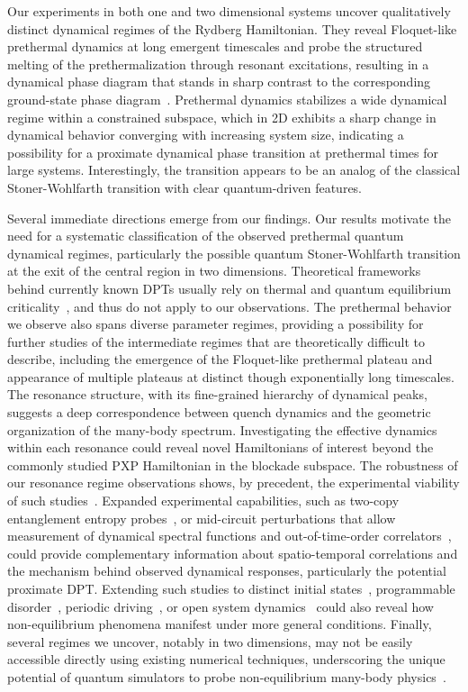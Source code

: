 \documentclass[english,floatfix,twocolumn,showpacs, aps, prx, reprint, superscriptaddress, longbibliography]{revtex4-2}
\begin{document}
Our experiments in both one and two dimensional systems uncover qualitatively distinct dynamical regimes of the Rydberg Hamiltonian. They reveal Floquet-like prethermal dynamics at long emergent timescales and probe the structured melting of the prethermalization through resonant excitations, resulting in a dynamical phase diagram that stands in sharp contrast to the corresponding ground-state phase diagram~\cite{Ebadi:2021}. Prethermal dynamics stabilizes a wide dynamical regime within a constrained subspace, which in 2D exhibits a sharp change in dynamical behavior converging with increasing system size, indicating a  possibility for a proximate dynamical phase transition at prethermal times for large systems. Interestingly, the transition appears to be an analog of the classical Stoner-Wohlfarth transition with clear quantum-driven features. 

Several immediate directions emerge from our findings. Our results motivate the need for a systematic classification of the observed prethermal quantum dynamical regimes, particularly the possible quantum Stoner-Wohlfarth transition at the exit of the central region in two dimensions. Theoretical frameworks behind currently known DPTs usually rely on thermal and quantum equilibrium criticality~\cite{Heyl:2013, Halimeh:2017, Titum:2019, Zunkovic:2018}, and thus do not apply to our observations. The prethermal behavior we observe also spans diverse parameter regimes, providing a possibility for further studies of the intermediate regimes that are theoretically difficult to describe, including the emergence of the Floquet-like prethermal plateau and appearance of multiple plateaus at distinct though exponentially long timescales. The resonance structure, with its fine-grained hierarchy of dynamical peaks, suggests a deep correspondence between quench dynamics and the geometric organization of the many-body spectrum. Investigating the effective dynamics within each resonance could reveal novel Hamiltonians of interest beyond the commonly studied PXP Hamiltonian in the blockade subspace. The robustness of our resonance regime observations shows, by precedent, the experimental viability of such studies~\cite{Liu:2022}. Expanded experimental capabilities, such as two-copy entanglement entropy probes~\cite{Bluvstein:2022}, or mid-circuit perturbations that allow measurement of dynamical spectral functions and out-of-time-order correlators~\cite{Swingle:2016}, could provide complementary information about spatio-temporal correlations and the mechanism behind observed dynamical responses, particularly the potential proximate DPT. Extending such studies to distinct initial states~\cite{Daniel:2023}, programmable disorder~\cite{Hashizume:2025}, periodic driving~\cite{Bluvstein:2021, Hudomal:2022}, or open system dynamics~\cite{Chertkov:2023, Iadecola:2025} could also reveal how non-equilibrium phenomena manifest under more general conditions. Finally, several regimes we uncover, notably in two dimensions, may not be easily accessible directly using existing numerical techniques, underscoring the unique potential of quantum simulators to probe non-equilibrium many-body physics~\cite{Daley:2022}.
\end{document}
